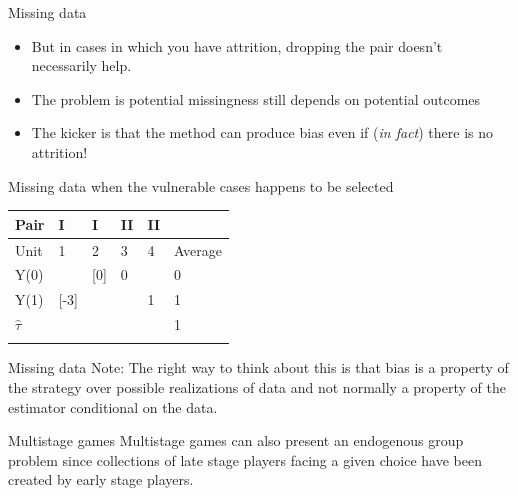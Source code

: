 \documentclass[
  11pt,
  ignorenonframetext,
]{beamer}
\providecommand{\tightlist}{%
  \setlength{\itemsep}{0pt}\setlength{\parskip}{0pt}}\usepackage{longtable,booktabs,array}
\begin{document}
\begin{frame}{Missing data}
\protect\hypertarget{missing-data-1}{}
\begin{itemize}
\tightlist
\item
  But in cases in which you have attrition, dropping the pair doesn't
  necessarily help.
\item
  The problem is potential missingness still depends on potential
  outcomes
\item
  The kicker is that the method can produce bias even if (\emph{in
  fact}) there is no attrition!
\end{itemize}

Missing data when the vulnerable cases happens to be selected

\begin{longtable}[]{@{}llllll@{}}
\toprule\noalign{}
Pair & I & I & II & II & \\
\midrule\noalign{}
\endhead
Unit & 1 & 2 & 3 & 4 & Average \\
Y(0) & & {[}0{]} & 0 & & 0 \\
Y(1) & {[}-3{]} & & & 1 & 1 \\
\(\hat{\tau}\) & & & & & 1 \\
\bottomrule\noalign{}
\end{longtable}
\end{frame}

\begin{frame}{Missing data}
\protect\hypertarget{missing-data-2}{}
Note: The right way to think about this is that bias is a property of
the strategy over possible realizations of data and not normally a
property of the estimator conditional on the data.
\end{frame}

\begin{frame}{Multistage games}
\protect\hypertarget{multistage-games}{}
Multistage games can also present an endogenous group problem since
collections of late stage players facing a given choice have been
created by early stage players.
\end{frame}
\end{document}

